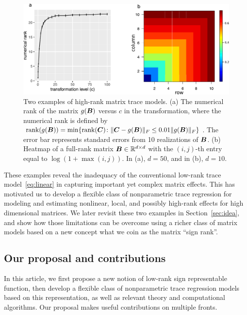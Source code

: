 \documentclass[aos]{imsart}
\theoremstyle{definition}
\def\rank{\textup{rank}}
\begin{document}
\begin{figure}
\includegraphics[width=.8\textwidth]{figure/low_rank.pdf}
\caption{Two examples of high-rank matrix trace models. (a) The numerical rank of the matrix $g(\bm B)$ versus $c$ in the transformation, where the numerical rank is defined by $\rank(g(\mB))=\min\{\rank(\mC )\colon \FnormSize{}{\mC-g(\mB)} \leq 0.01 \FnormSize{}{g(\mB)} \}$. The error bar represents standard errors from 10 realizations of $\bm B$. (b) Heatmap of a full-rank matrix $\bm B\in\mathbb{R}^{d\times d}$ with the $(i,j)$-th entry equal to $\log(1+\max(i,j))$. In (a), $d=50$, and in (b), $d=10$.} 
\label{fig:limit}
\label{penG}
\end{figure}

These examples reveal the inadequacy of the conventional low-rank trace model~\eqref{eq:linear} in capturing important yet complex matrix effects. This has motivated us to develop a flexible class of nonparametric trace regression for modeling and estimating nonlinear, local, and possibly high-rank effects for high dimensional matrices. We later revisit these two examples in Section~\ref{sec:idea}, and show how those limitations can be overcome using a richer class of matrix models based on a new concept what we coin as the matrix ``sign rank''. 



\subsection{Our proposal and contributions}

In this article, we first propose a new notion of low-rank sign representable function, then develop a flexible class of nonparametric trace regression models based on this representation, as well as relevant theory and computational algorithms. Our proposal makes useful contributions on multiple fronts. 
\end{document}
